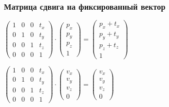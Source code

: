 \documentclass{beamer}
\begin{document}
\begin{frame}[fragile]
\frametitle{Матрица сдвига на фиксированный вектор}
\begin{center}
\begin{math}
\begin{pmatrix}
1 & 0 & 0 & t_x \\
0 & 1 & 0 & t_y \\
0 & 0 & 1 & t_z \\
0 & 0 & 0 & 1
\end{pmatrix}
\cdot
\begin{pmatrix}
p_x \\
p_y \\
p_z \\
1
\end{pmatrix}
=
\begin{pmatrix}
p_x + t_x \\
p_y + t_y\\
p_z + t_z\\
1
\end{pmatrix}
\end{math}

\begin{math}
\begin{pmatrix}
1 & 0 & 0 & t_x \\
0 & 1 & 0 & t_y \\
0 & 0 & 1 & t_z \\
0 & 0 & 0 & 1
\end{pmatrix}
\cdot
\begin{pmatrix}
v_x \\
v_y \\
v_z \\
0
\end{pmatrix}
=
\begin{pmatrix}
v_x\\
v_y\\
v_z\\
0
\end{pmatrix}
\end{math}
\end{center}
\end{frame}
\end{document}
